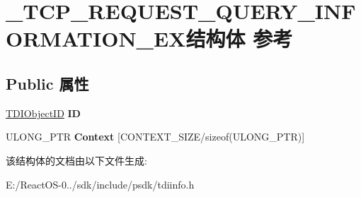 \hypertarget{struct___t_c_p___r_e_q_u_e_s_t___q_u_e_r_y___i_n_f_o_r_m_a_t_i_o_n___e_x}{}\section{\+\_\+\+T\+C\+P\+\_\+\+R\+E\+Q\+U\+E\+S\+T\+\_\+\+Q\+U\+E\+R\+Y\+\_\+\+I\+N\+F\+O\+R\+M\+A\+T\+I\+O\+N\+\_\+\+E\+X结构体 参考}
\label{struct___t_c_p___r_e_q_u_e_s_t___q_u_e_r_y___i_n_f_o_r_m_a_t_i_o_n___e_x}
\subsection*{Public 属性}
\begin{DoxyCompactItemize}
\item 
\mbox{\label{struct___t_c_p___r_e_q_u_e_s_t___q_u_e_r_y___i_n_f_o_r_m_a_t_i_o_n___e_x_a17c27d841b96c65b3cf93a192a4bc64a}} 
\hyperlink{struct___t_d_i_object_i_d}{T\+D\+I\+Object\+ID} {\bfseries ID}
\item 
\mbox{\label{struct___t_c_p___r_e_q_u_e_s_t___q_u_e_r_y___i_n_f_o_r_m_a_t_i_o_n___e_x_a8560ed7e30390e9ecf2e9692327ffca8}} 
U\+L\+O\+N\+G\+\_\+\+P\+TR {\bfseries Context} \mbox{[}C\+O\+N\+T\+E\+X\+T\+\_\+\+S\+I\+ZE/sizeof(U\+L\+O\+N\+G\+\_\+\+P\+TR)\mbox{]}
\end{DoxyCompactItemize}


该结构体的文档由以下文件生成\+:\begin{DoxyCompactItemize}
\item 
E\+:/\+React\+O\+S-\/0../sdk/include/psdk/tdiinfo.\+h\end{DoxyCompactItemize}
